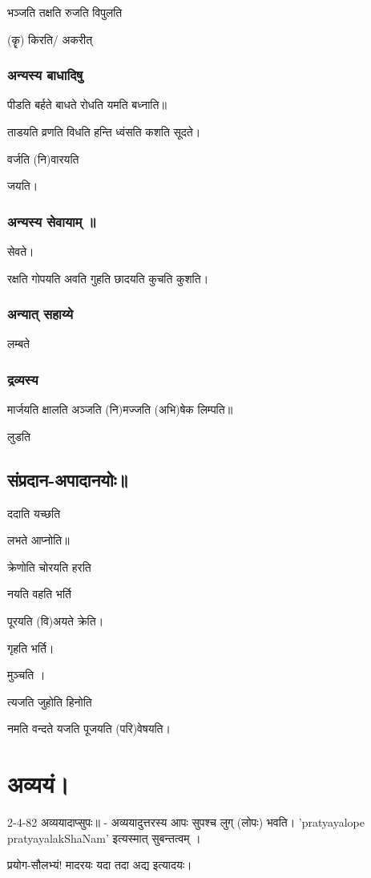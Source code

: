 \documentclass[oneside, article]{memoir}
\begin{document}
भञ्जति तक्षति रुजति विपुलति

(कॄ) किरति/ अकरीत्

\subsection{अन्यस्य बाधादिषु}
पीडति बर्हते बाधते रोधति यमति बध्नाति॥

ताडयति व्रणति विधति हन्ति ध्वंसति कशति सूदते।

वर्जति (नि)वारयति 

जयति।

\subsection{अन्यस्य सेवायाम् ॥}
सेवते।

रक्षति गोपयति अवति गुहति छादयति कुचति कुशति।

\subsection{अन्यात् सहाय्ये}
लम्बते

\subsection{द्रव्यस्य}
मार्जयति क्षालति अञ्जति (नि)मज्जति (अभि)षेक लिम्पति॥

लुडति

\section{संप्रदान-अपादानयोः॥}
ददाति यच्छति

लभते आप्नोति॥

क्रेणोति चोरयति हरति 

नयति वहति भर्ति 

पूरयति (वि)अयते क्रेति।

गृहति भर्ति।

मुञ्चति ।

त्यजति जुहोति हिनोति

नमति वन्दते यजति पूजयति (परि)वेषयति।

\chapter{अव्ययं।}
2-4-82 अव्ययादाप्सुपः॥ - अव्ययादुत्तरस्य आपः सुपश्च लुग् (लोपः) भवति। 'pratyayalope pratyayalakShaNam' इत्यस्मात् सुबन्तत्वम् ।

प्रयोग-सौलभ्यं! मादरयः यदा तदा अद्य इत्यादयः।
\end{document}
